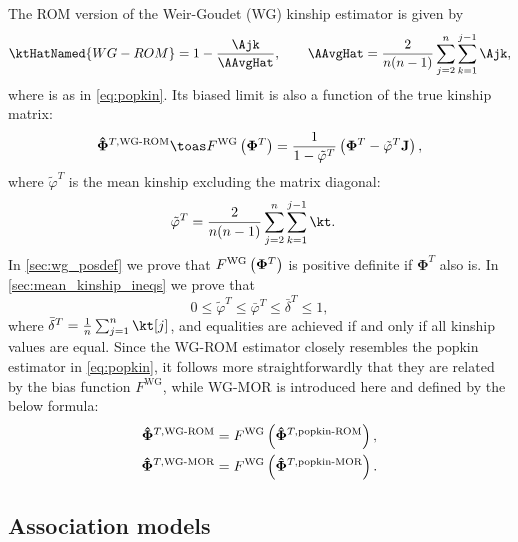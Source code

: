 \documentclass[11pt]{article}
\newcommand{\kinMat}[1][T]{%
  \ensuremath{%
    \mathbf{\Phi}^{#1}
  }%
  \xspace%
}%
\newcommand{\kinMatEstNamed}[1]{%
  \ensuremath{%
    \mathbf{\hat{\Phi}}^{T,\text{#1}}
  }%
  \xspace%
}%
\begin{document}
The ROM version of the Weir-Goudet (WG) kinship estimator is given by \citep{weir_unified_2017, ochoa_estimating_2021}
\begin{equation}
  \label{eq:wg}
  \ktHatNamed{WG-ROM}
  =
  1 - \frac{\Ajk}{\AAvgHat}
  , \quad\quad
  \AAvgHat
  =
  \frac{2}{n(n-1)}
  \sum_{j=2}^n
  \sum_{k=1}^{j-1}
    \Ajk
    ,
\end{equation}
where \Ajk is as in \cref{eq:popkin}.
Its biased limit is also a function of the true kinship matrix:
\begin{equation}
  \label{eq:wg_lim}
  \kinMatEstNamed{WG-ROM}
  \toas
  F^\text{WG} \left( \kinMat \right)
  =
  \frac{1}{1 - \tilde{\varphi}^T}
  \left( \kinMat - \tilde{\varphi}^T \mathbf{J} \right)
  ,
\end{equation}
where $\tilde{\varphi}^T$ is the mean kinship excluding the matrix diagonal:
\begin{equation}
  \label{eq:wg_tilde}
  \begin{split}
    \tilde{\varphi}^T
    &=
    \frac{2}{n(n-1)}
    \sum_{j=2}^n
    \sum_{k=1}^{j-1}
    \kt
    .
  \end{split}
\end{equation}
In \cref{sec:wg_posdef} we prove that $F^\text{WG} \left( \kinMat \right)$ is positive definite if \kinMat also is.
In \cref{sec:mean_kinship_ineqs} we prove that
$$
0 \le \tilde{\varphi}^T \le \bar{\varphi}^T \le \bar{\delta}^T \le 1,
$$
where $\bar{\delta}^T = \frac{1}{n} \sum_{j=1}^n \kt[j]$, and equalities are achieved if and only if all kinship values are equal.
Since the WG-ROM estimator closely resembles the popkin estimator in \cref{eq:popkin}, it follows more straightforwardly that they are related by the bias function $F^\text{WG}$, while WG-MOR is introduced here and defined by the below formula:
\begin{align*}
  \kinMatEstNamed{WG-ROM}
  &=
    F^\text{WG} \left( \kinMatEstNamed{popkin-ROM} \right)
    , \\
  \kinMatEstNamed{WG-MOR}
  &=
    F^\text{WG} \left( \kinMatEstNamed{popkin-MOR} \right)
  .
\end{align*}

\subsection{Association models}
\end{document}
